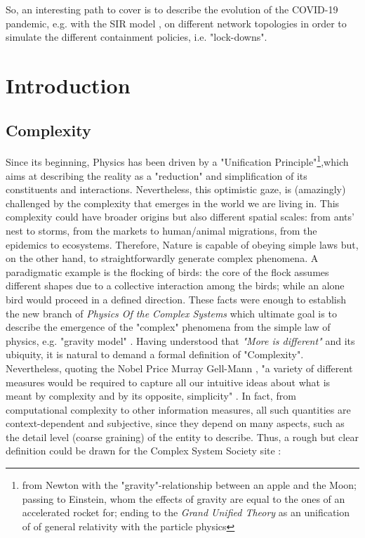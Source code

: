 \documentclass[a4paper,10pt,twoside]{book} %
\theoremstyle{definition}
\begin{document}
So, an interesting path to cover is to describe the evolution of the COVID-19 pandemic, e.g. with the SIR model \cite{pizzuti::2020_ItalyCOVIDnetwork}, on different network topologies in order to simulate the different containment policies, i.e. "lock-downs".

\mainmatter

\newcommand{\changefont}{%
    \fontsize{12}{12}
}
\pagestyle{fancy}
\fancyhf{}
\fancyhead[LE,RO]{\changefont \slshape \nouppercase{\rightmark}} %
\fancyhead[RE,LO]{\changefont \slshape \nouppercase{\leftmark}} %
\fancyfoot[C]{\thepage}

\chapter[Introduction]{Introduction}
%

\section{Complexity}
Since its beginning, Physics has been driven by a "Unification Principle"\footnote{from Newton with the "gravity"-relationship between an apple and the Moon; passing to Einstein, whom the effects of gravity are equal to the ones of an accelerated rocket for; ending to the \textit{Grand Unified Theory} as an unification of of general relativity with the particle physics},which aims at describing the reality as a "reduction" and simplification of its constituents and interactions. Nevertheless, this optimistic gaze, is (amazingly) challenged by the complexity that emerges in the world we are living in. This complexity could have broader origins but also different spatial scales: from ants' nest to storms, from the markets to human/animal migrations, from the epidemics to ecosystems. Therefore, Nature is capable of obeying simple laws but, on the other hand, to straightforwardly generate complex phenomena. A paradigmatic example is the flocking of birds: the core of the flock assumes different shapes due to a collective interaction among the birds; while an alone bird would proceed in a defined direction.
These facts were enough to establish the new branch of \textit{Physics Of the Complex Systems} which ultimate goal is to describe the emergence of the "complex" phenomena from the simple law of physics, e.g. "gravity model" \cite{GravityModelsandEmpiricalTrade}.
Having understood that \textit{"More is different"} \cite{Anderson:1972_MoreIsDifferent} and its ubiquity, it is natural to demand a formal definition of "Complexity". Nevertheless, quoting the Nobel Price Murray Gell-Mann \cite{Gell-Man:1987_S&C}, "a variety of different measures would be required to capture all our intuitive ideas about what is meant by complexity and by its opposite, simplicity" . In fact, from computational complexity to other information measures, all such quantities are context-dependent and subjective, since they depend on many aspects, such as the detail level (coarse graining) of the entity to describe. Thus, a rough but clear definition could be drawn for the Complex System Society site \cite{CSS:2021_compsystdef}:
\end{document}
